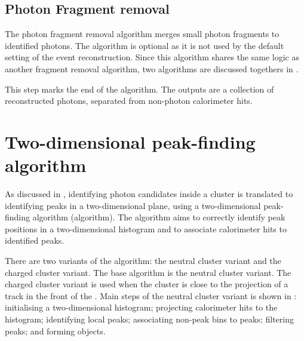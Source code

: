 \subsection{Photon Fragment removal}
\label{sec:photonRecoFragRemoval}

The  photon fragment removal algorithm merges small photon fragments to identified photons. The algorithm is optional as it is not used by the default setting of the event reconstruction. Since this algorithm shares the same logic as another fragment removal algorithm, two algorithms are discussed togethers in .


This step marks the end of the \PhotonReconstruction algorithm. The outputs are a collection of reconstructed photons, separated from non-photon calorimeter hits.

\section{Two-dimensional peak-finding algorithm}
\label{sec:peakFinding}

As discussed in , identifying photon candidates inside a cluster is translated to identifying peaks in a two-dimensional plane, using a two-dimensional peak-finding algorithm (\peakFinding algorithm). The \peakFinding algorithm aims to correctly identify peak positions in a two-dimensional histogram and to associate calorimeter hits to identified peaks.


There are two variants of the \peakFinding algorithm: the neutral cluster variant and the charged cluster variant. The base algorithm is  the neutral cluster variant. The charged cluster variant is used when the cluster is close to the projection of a track in the front of the \ECAL. Main steps of the  neutral cluster variant is shown in : initialising a two-dimensional histogram; projecting  calorimeter hits to the histogram; identifying local peaks; associating non-peak bins to peaks; filtering peaks; and forming \ShowerPeak objects.


